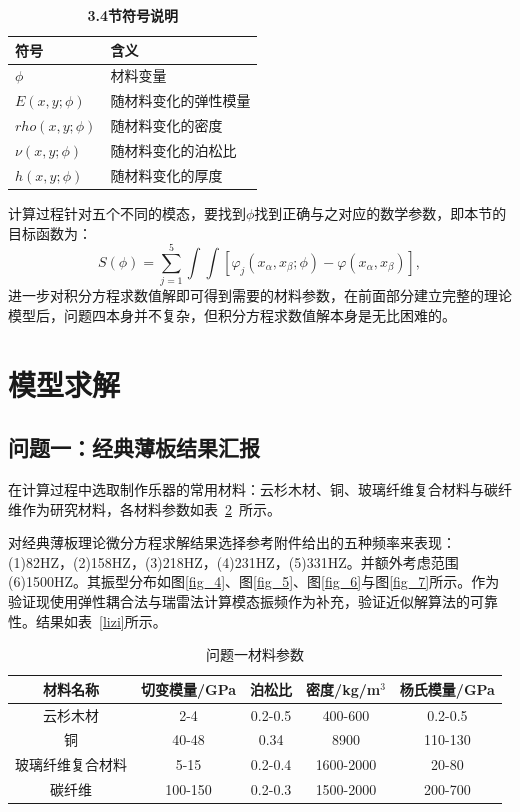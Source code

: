 \documentclass[withoutpreface,bwprint]{cumcmthesis} %
\begin{document}
\begin{table}[H]
	\caption{\textbf{3.4节符号说明}}%
	\centering
	\begin{tabular}{ll}%
		\hline %
		符号   &  含义  \\
		\hline %
		$\phi$&材料变量\\
  	$E(x,y;\phi)$&随材料变化的弹性模量\\
		$rho(x,y;\phi)$&随材料变化的密度\\
		$\nu(x,y;\phi)$&随材料变化的泊松比\\
        $h(x,y;\phi)$&随材料变化的厚度\\
		\hline %
	\end{tabular}\label{table-8}
\end{table}
计算过程针对五个不同的模态，要找到$\phi$找到正确与之对应的数学参数，即本节的目标函数为：
\begin{equation}
    S\left(\phi\right)=\sum_{j=1}^5\int\int\left[\varphi_j\left(x_\alpha,x_\beta;\phi\right)-\varphi\left(x_\alpha,x_\beta\right)\right], \label{40}
\end{equation}
进一步对积分方程求数值解即可得到需要的材料参数，在前面部分建立完整的理论模型后，问题四本身并不复杂，但积分方程求数值解本身是无比困难的。
\section{模型求解}
\subsection{问题一：经典薄板结果汇报}
在计算过程中选取制作乐器的常用材料：云杉木材、铜、玻璃纤维复合材料与碳纤维作为研究材料，各材料参数如表~\ref{table1}~所示。

对经典薄板理论微分方程求解结果选择参考附件给出的五种频率来表现：(1)82HZ，(2)158HZ，(3)218HZ，(4)231HZ，(5)331HZ。并额外考虑范围(6)1500HZ。其振型分布如图\ref{fig_4}、图\ref{fig_5}、图\ref{fig_6}与图\ref{fig_7}所示。作为验证现使用弹性耦合法与瑞雷法计算模态振频作为补充，验证近似解算法的可靠性。结果如表~\ref{lizi}所示。

\begin{table}[htb]
\centering
\caption{问题一材料参数}
\label{table1}
\begin{tabular}{@{}ccccc@{}}
\toprule
\textbf{材料名称} & \textbf{切变模量/GPa} & \textbf{泊松比} & \textbf{密度/kg/m$^3$} & \textbf{杨氏模量/GPa} \\
\midrule
云杉木材 & 2-4 & 0.2-0.5 & 400-600 & 0.2-0.5 \\
铜 & 40-48 & 0.34 & 8900 & 110-130 \\
玻璃纤维复合材料 & 5-15 & 0.2-0.4 & 1600-2000 & 20-80 \\
碳纤维 & 100-150 & 0.2-0.3 & 1500-2000 & 200-700 \\
\bottomrule
\end{tabular}
\end{table}
\end{document}

